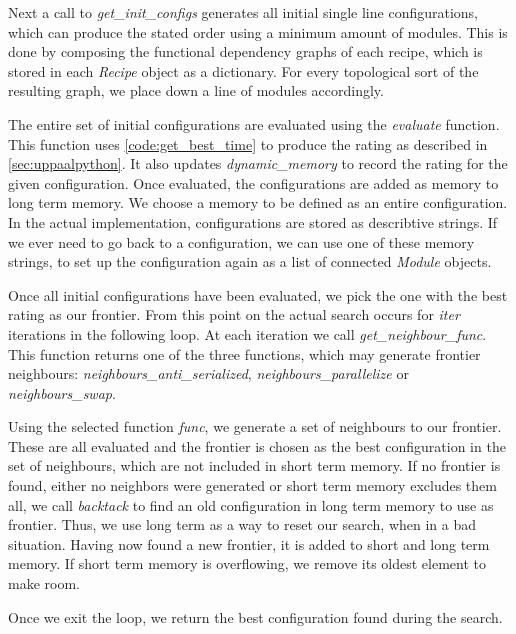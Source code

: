 Next a call to \textit{get\_init\_configs} generates all initial single line configurations, which can produce the stated order using a minimum amount of modules. This is done by composing the functional dependency graphs of each recipe, which is stored in each \textit{Recipe} object as a dictionary. For every topological sort of the resulting graph, we place down a line of modules accordingly. 

The entire set of initial configurations are evaluated using the \textit{evaluate} function. This function uses  \cref{code:get_best_time} to produce the rating as described in \cref{sec:uppaalpython}. It also updates \textit{dynamic\_memory} to record the rating for the given configuration. Once evaluated, the configurations are added as memory to long term memory. We choose a memory to be defined as an entire configuration. In the actual implementation, configurations are stored as describtive strings. If we ever need to go back to a configuration, we can use one of these memory strings, to set up the configuration again as a list of connected \textit{Module} objects.

Once all initial configurations have been evaluated, we pick the one with the best rating as our frontier. From this point on the actual search occurs for \textit{iter} iterations in the following loop. At each iteration we call \textit{get\_neighbour\_func}. This function returns one of the three functions, which may generate frontier neighbours: \textit{neighbours\_anti\_serialized}, \textit{neighbours\_parallelize} or \textit{neighbours\_swap}.

Using the selected function \textit{func}, we generate a set of neighbours to our frontier. These are all evaluated and the frontier is chosen as the best configuration in the set of neighbours, which are not included in short term memory. If no frontier is found, either no neighbors were generated or short term memory excludes them all, we call \textit{backtack} to find an old configuration in long term memory to use as frontier. Thus, we use long term as a way to reset our search, when in a bad situation. Having now found a new frontier, it is added to short and long term memory. If short term memory is overflowing, we remove its oldest element to make room. 

Once we exit the loop, we return the best configuration found during the search. 